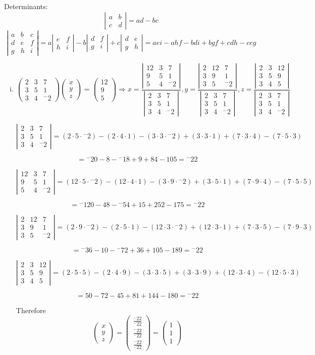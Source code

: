 \documentclass{article}
\def\cramersMatrix#1#2#3#4#5#6#7#8#9{
  \def\a{{#1}}
  \def\b{{#2}}
  \def\c{{#3}}
  \def\d{{#4}}
  \def\e{{#5}}
  \def\f{{#6}}
  \def\g{{#7}}
  \def\h{{#8}}
  \def\i{{#9}}
}
\def\cramersVector#1#2#3{
  \def\j{{#1}}
  \def\k{{#2}}
  \def\l{{#3}}
}
\newcommand{\cramers}[0]
{
\[
	\left(
		\begin{array}{ccc}
			\a & \b & \c \\
			\d & \e & \f \\
			\g & \h & \i
		\end{array}
	\right)
	\left(
		\begin{array}{c}
			x \\
			y \\
			z
		\end{array}
	\right)
	=
	\left(
		\begin{array}{c}
			\j \\
			\k \\
			\l
		\end{array}
	\right)
	\Rightarrow
	x=
	\frac
	{
		\left|
			\begin{array}{ccc}
				\j & \b & \c \\
				\k & \e & \f \\
				\l & \h & \i
			\end{array}
		\right|
	}
	{
		\left|
			\begin{array}{ccc}
				\a & \b & \c \\
				\d & \e & \f \\
				\g & \h & \i
			\end{array}
		\right|
	},
	y=
	\frac
	{
		\left|
			\begin{array}{ccc}
				\a & \j & \c \\
				\d & \k & \f \\
				\g & \l & \i
			\end{array}
		\right|
	}
	{
		\left|
			\begin{array}{ccc}
				\a & \b & \c \\
				\d & \e & \f \\
				\g & \h & \i
			\end{array}
		\right|
	},
	z=
	\frac
	{
		\left|
			\begin{array}{ccc}
				\a & \b & \j \\
				\d & \e & \k \\
				\g & \h & \l
			\end{array}
		\right|
	}
	{
		\left|
			\begin{array}{ccc}
				\a & \b & \c \\
				\d & \e & \f \\
				\g & \h & \i
			\end{array}
		\right|
	}
\]
}
\newcommand{\determinant}[9]
{
\cramersMatrix{#1}{#2}{#3}{#4}{#5}{#6}{#7}{#8}{#9}
\[
	\left|
		\begin{array}{ccc}
			\a & \b & \c \\
			\d & \e & \f \\
			\g & \h & \i
		\end{array}
	\right|
	= (\a \cdot \e \cdot \i) - (\a \cdot \h \cdot \f) - (\b \cdot \d \cdot \i) + (\b \cdot \g \cdot \f) + (\c \cdot \d \cdot \h) - (\c \cdot \e \cdot \g)
\]
}
\begin{document}
\begin{enumerate}
Determinants:
\[
	\left|
		\begin{array}{cc}
			a & b \\
			c & d
		\end{array}
	\right|
	= ad - bc
\]
\[
	\left|
		\begin{array}{ccc}
			a & b & c \\
			d & e & f \\
			g & h & i
		\end{array}
	\right|
	=a
	\left|
		\begin{array}{cc}
			e & f \\
			h & i
		\end{array}
	\right|
	-b
	\left|
		\begin{array}{cc}
			d & f \\
			g & i
		\end{array}
	\right|
	+c
	\left|
		\begin{array}{cc}
			d & e \\
			g & h
		\end{array}
	\right|
	= aei - ahf - bdi + bgf + cdh - ceg
\]


\begin{enumerate}[i.]

\item
\cramersMatrix{2}{3}{7}{3}{5}{1}{3}{4}{{^-}2}
\cramersVector{12}{9}{5}
\cramers

\determinant{2}{3}{7}{3}{5}{1}{3}{4}{{^-}2}
\[
	= {^-}20 - 8 - {^-}18 + 9 + 84 - 105 = {^-}22
\]

\determinant{12}{3}{7}{9}{5}{1}{5}{4}{{^-}2}
\[
	= {^-}120 - 48 - {^-}54 + 15 + 252 - 175 = {^-}22
\]

\determinant{2}{12}{7}{3}{9}{1}{3}{5}{{^-}2}
\[
	= {^-}36 - 10 - {^-}72 + 36 + 105 - 189 = {^-}22
\]

\determinant{2}{3}{12}{3}{5}{9}{3}{4}{5}
\[
	= 50 - 72 - 45 + 81 + 144 - 180 = {^-}22
\]

Therefore
\[
	\left(
		\begin{array}{c}
			x \\
			y \\
			z
		\end{array}
	\right)
	=
	\left(
		\begin{array}{c}
			\frac{{^-}22}{{^-}22} \\
			\frac{{^-}22}{{^-}22} \\
			\frac{{^-}22}{{^-}22}
		\end{array}
	\right)
	=
	\left(
		\begin{array}{c}
			1 \\
			1 \\
			1
		\end{array}
	\right)
\]

\end{enumerate}

\end{enumerate}
\end{document}

